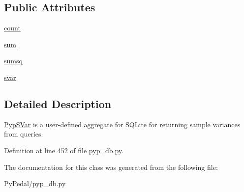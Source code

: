 \subsection*{Public Attributes}
\begin{CompactItemize}
\item 
\hypertarget{classPyPedal_1_1pyp__db_1_1PypSVar_77cf8d71068550345d6e79da818316dc}{
\hyperlink{classPyPedal_1_1pyp__db_1_1PypSVar_77cf8d71068550345d6e79da818316dc}{count}}
\label{classPyPedal_1_1pyp__db_1_1PypSVar_77cf8d71068550345d6e79da818316dc}

\item 
\hypertarget{classPyPedal_1_1pyp__db_1_1PypSVar_9196844e78bf077aa6fa5aeafd29ae3b}{
\hyperlink{classPyPedal_1_1pyp__db_1_1PypSVar_9196844e78bf077aa6fa5aeafd29ae3b}{sum}}
\label{classPyPedal_1_1pyp__db_1_1PypSVar_9196844e78bf077aa6fa5aeafd29ae3b}

\item 
\hypertarget{classPyPedal_1_1pyp__db_1_1PypSVar_cafde6c0eba47a9773dbb05236774ca4}{
\hyperlink{classPyPedal_1_1pyp__db_1_1PypSVar_cafde6c0eba47a9773dbb05236774ca4}{sumsq}}
\label{classPyPedal_1_1pyp__db_1_1PypSVar_cafde6c0eba47a9773dbb05236774ca4}

\item 
\hypertarget{classPyPedal_1_1pyp__db_1_1PypSVar_f909189cbfd801d338f7a3613a86e8aa}{
\hyperlink{classPyPedal_1_1pyp__db_1_1PypSVar_f909189cbfd801d338f7a3613a86e8aa}{svar}}
\label{classPyPedal_1_1pyp__db_1_1PypSVar_f909189cbfd801d338f7a3613a86e8aa}

\end{CompactItemize}


\subsection{Detailed Description}
\hyperlink{classPyPedal_1_1pyp__db_1_1PypSVar}{PypSVar} is a user-defined aggregate for SQLite for returning sample variances from queries. 

Definition at line 452 of file pyp\_\-db.py.

The documentation for this class was generated from the following file:\begin{CompactItemize}
\item 
PyPedal/pyp\_\-db.py\end{CompactItemize}

